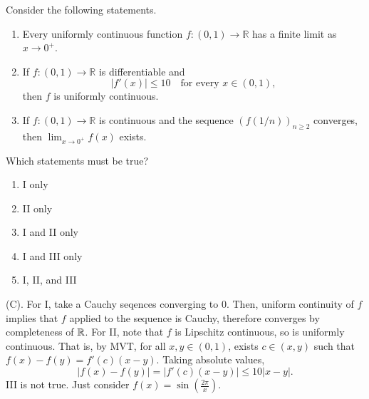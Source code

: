 \begin{exercise}
Consider the following statements.

\begin{enumerate}[label=\Roman*.]
    \item Every uniformly continuous function
    $f:(0,1)\to\mathbb R$ has a finite
    limit as $x\to0^+$.

    \item If $f:(0,1)\to\mathbb R$ is
    differentiable and
    \[
    |f'(x)|\le10
    \quad\text{for every }x\in(0,1),
    \]
    then $f$ is uniformly continuous.

    \item If $f:(0,1)\to\mathbb R$
    is continuous and the sequence
    $(f(1/n))_{n\ge2}$ converges,
    then $\lim_{x\to0^+}f(x)$ exists.
\end{enumerate}
Which statements must be true?
\begin{enumerate}[label=(\Alph*)]
    \item I only
    \item II only
    \item I and II only
    \item I and III only
    \item I, II, and III
\end{enumerate}
\end{exercise}
\begin{solution}
(C). For I, take a Cauchy seqences converging to $0$. Then, uniform continuity of $f$ implies that 
$f$ applied to the sequence is Cauchy, therefore converges by completeness of $\mathbb{R}$. 
For II, note that $f$ is Lipschitz continuous, so is uniformly continuous. That is, by MVT, 
for all $x,y \in (0,1)$, exists $c \in (x,y)$ such that $f(x) - f(y) = f'(c)(x-y)$. Taking 
absolute values,
\[
|f(x) - f(y)| = |f'(c)(x-y)| \leq 10 |x-y|.
\]
III is not true. Just consider $f(x) = \sin\left(\frac{2\pi}{x}\right)$.
\end{solution}

